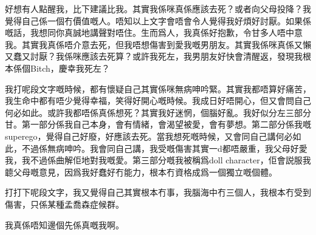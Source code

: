 好想有人點醒我，比下建議比我。其實我係咪真係應該去死？或者向父母投降？我覺得自己係一個冇價值嘅人。唔知以上文字會唔會令人覺得我好煩好討厭。如果係嘅話，我想同你真誠地講聲對唔住。生而爲人，我真係好抱歉，令甘多人唔中意我。其實我真係唔介意去死，但我唔想傷害到愛我嘅男朋友。其實我係咪真係又懶又蠢又討厭？我係咪應該去死算？或許我死左，我男朋友好快會清醒返，發現我根本係個Bitch，慶幸我死左？

我打呢段文字嘅時候，都有懷疑自己其實係咪無病呻吟緊。其實我都唔算好痛苦，我生命中都有唔少覺得幸福，笑得好開心嘅時候。我成日好唔開心，但又會問自己何必如此。或許我都唔係真係想死？其實我好迷惘，個腦好亂。我好似分左三部分甘。第一部分係我自己本身，會有情緒，會渴望被愛，會有夢想。第二部分係我嘅superego，覺得自己好廢，好應該去死。當我想死嘅時候，又會同自己講何必如此，不過係無病呻吟。我會同自己講，我受嘅傷害其實一d都唔嚴重，我父母好愛我，我不過係曲解佢地對我嘅愛。第三部分嘅我被稱爲doll character，佢會説服我聼父母嘅意見，因爲我好蠢好冇能力，根本冇資格成爲一個獨立嘅個體。

打打下呢段文字，我又覺得自己其實根本冇事，我腦海中冇三個人，我根本冇受到傷害，只係某種孟喬森症候群。

我真係唔知邊個先係真嘅我啊。

